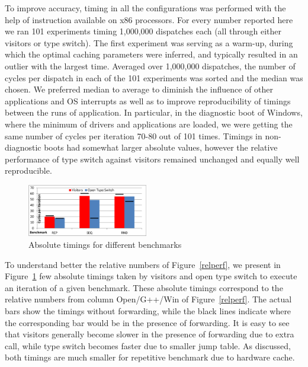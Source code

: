 \noindent
To improve accuracy, timing in all the configurations was performed with the 
help of  instruction available on x86 processors. For every number reported 
here we ran 101 experiments timing 1,000,000 dispatches each (all through either 
visitors or type switch). The first experiment was serving as a warm-up, during 
which the optimal caching parameters were inferred, and typically resulted in an 
outlier with the largest time. Averaged over 1,000,000 dispatches, the number of 
cycles per dispatch in each of the 101 experiments was sorted and the median was 
chosen. We preferred median to average to diminish the influence of other 
applications and OS interrupts as well as to improve reproducibility of timings 
between the runs of application. In particular, in the diagnostic boot of 
Windows, where the minimum of drivers and applications are loaded, we were 
getting the same number of cycles per iteration 70-80 out of 101 times. Timings 
in non-diagnostic boots had somewhat larger absolute values, however the 
relative performance of type switch against visitors remained unchanged and 
equally well reproducible.

\begin{figure}[htbp]
  \centering
    \includegraphics[width=0.47\textwidth]{VisitorsCompare.pdf}
  \caption{Absolute timings for different benchmarks}
  \label{fig:VisitorsComparison}
\end{figure}

To understand better the relative numbers of Figure~\ref{relperf}, we present 
in Figure~\ref{fig:VisitorsComparison} few absolute timings taken by visitors 
and open type switch to execute an iteration of a given benchmark. These absolute timings 
correspond to the relative numbers from column Open/G++/Win of Figure~\ref{relperf}.
The actual bars show the timings without forwarding, while the black lines 
indicate where the corresponding bar would be in the presence of forwarding. It 
is easy to see that visitors generally become slower in the presence of 
forwarding due to extra call, while type switch becomes faster due to smaller 
jump table. As discussed, both timings are much smaller for repetitive benchmark 
due to hardware cache.

